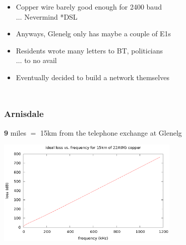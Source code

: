 \documentclass{beamer}
\begin{document}
\begin{frame}
\begin{columns}
\begin{itemize}
      \item Copper wire barely good enough for 2400 baud\\
        $\ldots$ Nevermind *DSL
      \item Anyways, Glenelg only has maybe a couple of E1s
      \item Residents wrote many letters to BT, politicians\\
        $\ldots$ to no avail
      \item Eventually decided to build a network themselves
    \end{itemize}
  \end{columns}
\end{frame}
\begin{frame}
  \frametitle{Arnisdale}
  \begin{center}
    \textbf{9} miles $=$ 15km from the telephone exchange at Glenelg
    \par\includegraphics[width=0.65\textwidth]{loss}
    \par\vspace{\baselineskip}
    \scalebox{0.5}{
      \begin{tikzpicture}
        \xmissionline
      \end{tikzpicture}
    }
    \end{center}
\end{frame}
\end{document}
